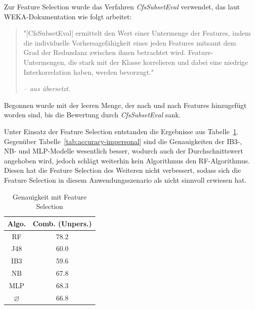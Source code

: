 Zur Feature Selection wurde das Verfahren \textit{CfsSubsetEval}\cite{Hall1998} verwendet, das laut WEKA-Dokumentation wie folgt arbeitet:

\begin{quote}
	"[CfsSubsetEval] ermittelt den Wert einer Untermenge der Features, indem die individuelle Vorhersagefähigkeit eines jeden Features mitsamt dem Grad der Redundanz zwischen ihnen betrachtet wird. Feature-Untermengen, die stark mit der Klasse korrelieren und dabei eine niedrige Interkorrelation haben, werden bevorzugt."
	
	\textit{-- aus \cite{WekaCfsSubsetEval} übersetzt.}
\end{quote}

Begonnen wurde mit der leeren Menge, der nach und nach Features hinzugefügt worden sind, bis die Bewertung durch \textit{CfsSubsetEval} sank.

Unter Einsatz der Feature Selection entstanden die Ergebnisse aus Tabelle~\ref{tab:accuracy-feature-selection}. Gegenüber Tabelle~\ref{tab:accuracy-impersonal} sind die Genauigkeiten der IB3-, NB- und MLP-Modelle wesentlich besser, wodurch auch der Durchschnittswert angehoben wird, jedoch schlägt weiterhin kein Algorithmus den RF-Algorithmus. Diesen hat die Feature Selection des Weiteren nicht verbessert, sodass sich die Feature Selection in diesem Anwendungsszenario als nicht sinnvoll erwiesen hat.

\begin{table}
\centering
\begin{tabular}{|c|c|}
	\hline 
	\textbf{Algo.} & \textbf{Comb. (Unpers.)} \\ 
	\hline 
	RF & 78.2 \\ 
	J48 & 60.0 \\ 
	IB3 & 59.6 \\ 
	NB & 67.8 \\ 
	MLP & 68.3 \\ 
	\hline 
	$\varnothing$ & 66.8 \\ 
	\hline 
\end{tabular}
\caption{Genauigkeit mit Feature Selection}
\label{tab:accuracy-feature-selection}
\end{table}


